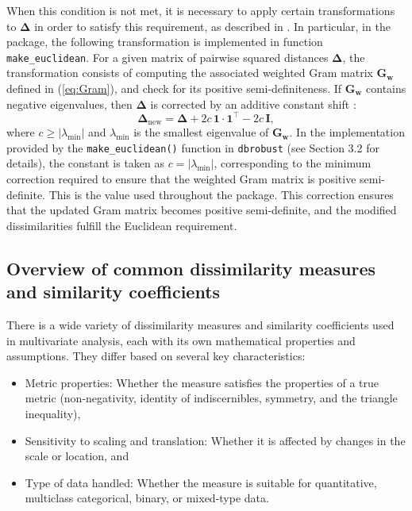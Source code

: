 When this condition is not met, it is necessary to apply certain transformations to $\mathbf{\Delta}$ in order to satisfy this requirement, as described in \cite{borg2005modern}. In particular, in the  package, the following transformation is implemented in function \texttt{make\_euclidean}. For a given matrix of pairwise squared distances $\mathbf{\Delta}$, the transformation consists of computing the associated weighted Gram matrix $\mathbf{G_w}$ defined in (\ref{eq:Gram}), and check for its positive semi-definiteness.
If $\mathbf{G_w}$ contains negative eigenvalues, then $\mathbf{\Delta}$ is corrected by an additive constant shift \citep{lingoes1971some, mardia1978some}:
\[
\mathbf{\Delta}_{\text{new}} = \mathbf{\Delta} + 2c\, \mathbf{1} \cdot \mathbf{1}^{\top} - 2c\, \mathbf{I},
\]
where $c \geq |\lambda_{\text{min}}|$ and $\lambda_{\text{min}}$ is the smallest eigenvalue of $\mathbf{G_w}$. In the implementation provided by the \texttt{make\_euclidean()} function in \texttt{dbrobust} (see Section 3.2 for details), the constant is taken as $c=|\lambda_{\text{min}}|$, corresponding to the minimum correction required to ensure that the weighted Gram matrix is positive semi-definite. This is the value used throughout the package. This correction ensures that the updated Gram matrix becomes positive semi-definite, and the modified dissimilarities fulfill the Euclidean requirement.

\subsection{Overview of common dissimilarity measures and similarity coefficients}

There is a wide variety of dissimilarity measures and similarity coefficients used in multivariate analysis, each with its own mathematical properties and assumptions. They differ based on several key characteristics:

\begin{itemize}
    \item Metric properties: Whether the measure satisfies the properties of a true metric (non-negativity, identity of indiscernibles, symmetry, and the triangle inequality),
    \item Sensitivity to scaling and translation: Whether it is affected by changes in the scale or location, and
    \item Type of data handled: Whether the measure is suitable for quantitative, multiclass categorical, binary, or mixed-type data.
\end{itemize}

